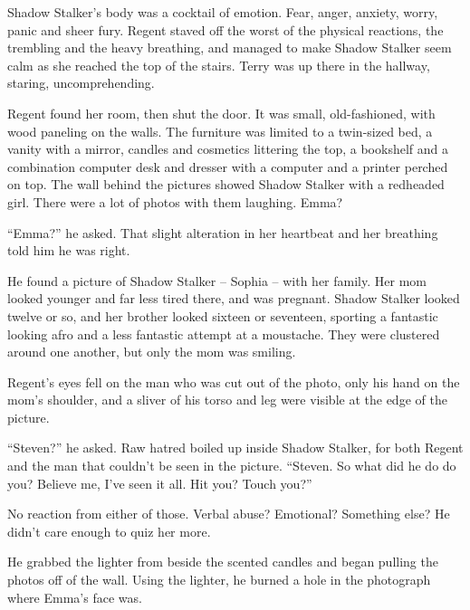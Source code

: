 Shadow Stalker's body was a cocktail of emotion.  Fear, anger, anxiety, worry, panic and sheer fury.  Regent staved off the worst of the physical reactions, the trembling and the heavy breathing, and managed to make Shadow Stalker seem calm as she reached the top of the stairs.  Terry was up there in the hallway, staring, uncomprehending.



Regent found her room, then shut the door.  It was small, old-fashioned, with wood paneling on the walls.  The furniture was limited to a twin-sized bed, a vanity with a mirror, candles and cosmetics littering the top, a bookshelf and a combination computer desk and dresser with a computer and a printer perched on top.  The wall behind the pictures showed Shadow Stalker with a redheaded girl.  There were a lot of photos with them laughing.  Emma?



``Emma?'' he asked.  That slight alteration in her heartbeat and her breathing told him he was right.



He found a picture of Shadow Stalker – Sophia – with her family.  Her mom looked younger and far less tired there, and was pregnant.  Shadow Stalker looked twelve or so, and her brother looked sixteen or seventeen, sporting a fantastic looking afro and a less fantastic attempt at a moustache.  They were clustered around one another, but only the mom was smiling.



Regent's eyes fell on the man who was cut out of the photo, only his hand on the mom's shoulder, and a sliver of his torso and leg were visible at the edge of the picture.



``Steven?'' he asked.  Raw hatred boiled up inside Shadow Stalker, for both Regent and the man that couldn't be seen in the picture.  ``Steven.  So what did he do do you?  Believe me, I've seen it all.  Hit you?  Touch you?''



No reaction from either of those.  Verbal abuse?  Emotional?  Something else?  He didn't care enough to quiz her more.



He grabbed the lighter from beside the scented candles and began pulling the photos off of the wall.  Using the lighter, he burned a hole in the photograph where Emma's face was.



